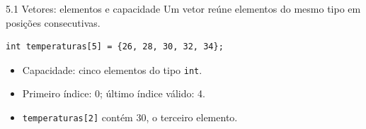 \begin{frame}[fragile]{5.1 Vetores: elementos e capacidade}
Um vetor reúne elementos do mesmo tipo em posições consecutivas.
\begin{lstlisting}
int temperaturas[5] = {26, 28, 30, 32, 34};
\end{lstlisting}
\begin{center}
\end{center}
\begin{itemize}
\item Capacidade: cinco elementos do tipo \texttt{int}.
\item Primeiro índice: 0; último índice válido: 4.
\item \texttt{temperaturas[2]} contém 30, o terceiro elemento.
\end{itemize}
\end{frame}
